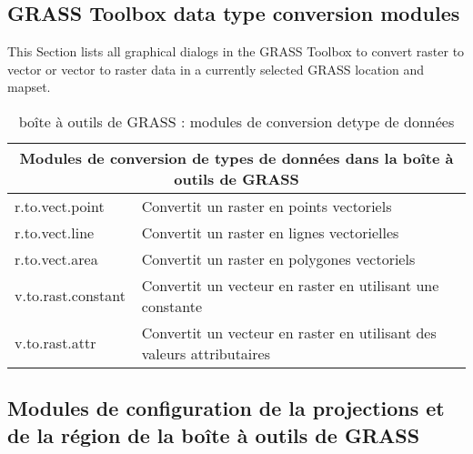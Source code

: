 \subsection{GRASS Toolbox data type conversion modules}

This Section lists all graphical dialogs in the GRASS Toolbox to convert
raster to vector or vector to raster data in a currently selected GRASS location 
and mapset.

\begin{table}[H]
\centering
 \begin{tabular}{|p{4cm}|p{10cm}|}
  \hline \multicolumn{2}{|c|}{\textbf{Modules de conversion de types de données dans la boîte à outils de GRASS}} \\
  \hline r.to.vect.point & Convertit un raster en points vectoriels \\
  \hline r.to.vect.line & Convertit un raster en lignes vectorielles \\
  \hline r.to.vect.area & Convertit un raster en polygones vectoriels \\
  \hline v.to.rast.constant & Convertit un vecteur en raster en utilisant une constante \\
  \hline v.to.rast.attr & Convertit un vecteur en raster en utilisant des valeurs attributaires\\
\hline
\end{tabular}
\caption{boîte à outils de GRASS : modules de conversion detype de données}
\end{table}

\subsection{Modules de configuration de la projections et de la région de la boîte à outils de GRASS }

